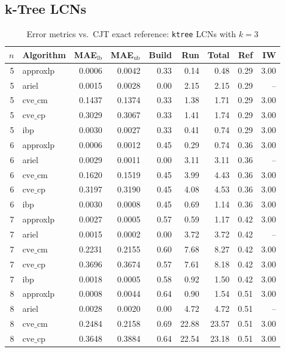 \documentclass{article}
\begin{document}
\subsection{k-Tree LCNs}
\begin{table}[ht]
\centering
\caption{Error metrics vs.\ CJT exact reference: \texttt{ktree} LCNs with $k=3$}
\begin{tabular}{rlrrrrrrr}
\toprule
 $n$ & Algorithm & MAE$_{\text{lb}}$ & MAE$_{\text{ub}}$ & Build & Run & Total & Ref & IW \\
\midrule
 5 & approxlp & 0.0006 & 0.0042 & 0.33 & 0.14 & 0.48 & 0.29 & 3.00 \\
 5 & ariel & 0.0015 & 0.0028 & 0.00 & 2.15 & 2.15 & 0.29 & -- \\
 5 & $\text{cve\_cm}$ & 0.1437 & 0.1374 & 0.33 & 1.38 & 1.71 & 0.29 & 3.00 \\
 5 & $\text{cve\_cp}$ & 0.3029 & 0.3067 & 0.33 & 1.41 & 1.74 & 0.29 & 3.00 \\
 5 & ibp & 0.0030 & 0.0027 & 0.33 & 0.41 & 0.74 & 0.29 & 3.00 \\
\hline
 6 & approxlp & 0.0006 & 0.0012 & 0.45 & 0.29 & 0.74 & 0.36 & 3.00 \\
 6 & ariel & 0.0029 & 0.0011 & 0.00 & 3.11 & 3.11 & 0.36 & -- \\
 6 & $\text{cve\_cm}$ & 0.1620 & 0.1519 & 0.45 & 3.99 & 4.43 & 0.36 & 3.00 \\
 6 & $\text{cve\_cp}$ & 0.3197 & 0.3190 & 0.45 & 4.08 & 4.53 & 0.36 & 3.00 \\
 6 & ibp & 0.0030 & 0.0008 & 0.45 & 0.69 & 1.14 & 0.36 & 3.00 \\
\hline
 7 & approxlp & 0.0027 & 0.0005 & 0.57 & 0.59 & 1.17 & 0.42 & 3.00 \\
 7 & ariel & 0.0015 & 0.0002 & 0.00 & 3.72 & 3.72 & 0.42 & -- \\
 7 & $\text{cve\_cm}$ & 0.2231 & 0.2155 & 0.60 & 7.68 & 8.27 & 0.42 & 3.00 \\
 7 & $\text{cve\_cp}$ & 0.3696 & 0.3674 & 0.57 & 7.61 & 8.18 & 0.42 & 3.00 \\
 7 & ibp & 0.0018 & 0.0005 & 0.58 & 0.92 & 1.50 & 0.42 & 3.00 \\
\hline
 8 & approxlp & 0.0008 & 0.0044 & 0.64 & 0.90 & 1.54 & 0.51 & 3.00 \\
 8 & ariel & 0.0028 & 0.0020 & 0.00 & 4.72 & 4.72 & 0.51 & -- \\
 8 & $\text{cve\_cm}$ & 0.2484 & 0.2158 & 0.69 & 22.88 & 23.57 & 0.51 & 3.00 \\
 8 & $\text{cve\_cp}$ & 0.3648 & 0.3884 & 0.64 & 22.54 & 23.18 & 0.51 & 3.00 \\

\end{tabular}
\end{table}
\end{document}
